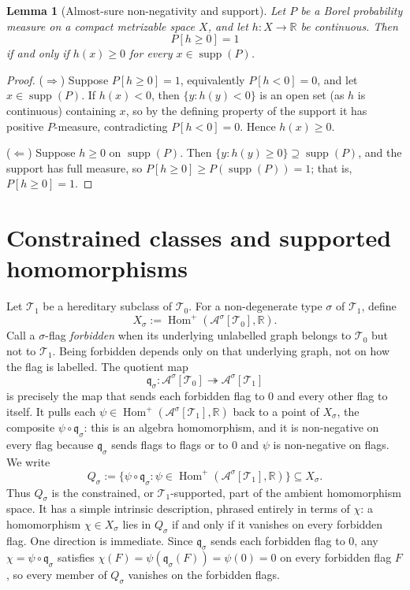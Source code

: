 \documentclass[11pt]{article}
\newtheorem{lemma}[theorem]{Lemma}
\theoremstyle{definition}
\newcommand{\R}{\mathbb{R}}
\newcommand{\A}{\mathcal{A}}
\newcommand{\T}{\mathcal{T}}
\newcommand{\Homp}{\operatorname{Hom}^{+}}
\newcommand{\supp}{\operatorname{supp}}
\newcommand{\qmap}{\mathfrak q}
\begin{document}
\begin{lemma}[Almost-sure non-negativity and support]\label{lem:support-as}
Let $P$ be a Borel probability measure on a compact metrizable space $X$, and let
$h:X\to\R$ be continuous.  Then
\[
  P[h\ge0]=1
\]
if and only if $h(x)\ge0$ for every $x\in\supp(P)$.
\end{lemma}

\begin{proof}
($\Rightarrow$) Suppose $P[h\ge0]=1$, equivalently $P[h<0]=0$, and let
$x\in\supp(P)$.  If $h(x)<0$, then $\{y:h(y)<0\}$ is an open set (as $h$ is continuous)
containing $x$, so by the defining property of the support it has positive $P$-measure,
contradicting $P[h<0]=0$.  Hence $h(x)\ge0$.

($\Leftarrow$) Suppose $h\ge0$ on $\supp(P)$.  Then
$\{y:h(y)\ge0\}\supseteq\supp(P)$, and the support has full measure, so
$P[h\ge0]\ge P(\supp(P))=1$; that is, $P[h\ge0]=1$.
\end{proof}

\section{Constrained classes and supported homomorphisms}

Let $\T_1$ be a hereditary subclass of $\T_0$.  For a non-degenerate type $\sigma$ of
$\T_1$, define
\[
  X_\sigma:=\Homp(\A^\sigma[\T_0],\R).
\]
Call a $\sigma$-flag \emph{forbidden} when its underlying unlabelled graph belongs to
$\T_0$ but not to $\T_1$.  Being forbidden depends only on
that underlying graph, not on how the flag is labelled.  The quotient map
\[
  \qmap_\sigma:\A^\sigma[\T_0]\twoheadrightarrow\A^\sigma[\T_1]
\]
is precisely the map that sends each forbidden flag to $0$ and every other flag to itself.
It pulls each $\psi\in\Homp(\A^\sigma[\T_1],\R)$ back to a point of $X_\sigma$, the composite
${\psi} \circ {\qmap_\sigma}$: this is an algebra homomorphism, and it is non-negative on every
flag because $\qmap_\sigma$ sends flags to flags or to $0$ and $\psi$ is non-negative on
flags.  We write
\[
  Q_\sigma
  :=
  \{\psi\circ\qmap_\sigma:
      \psi\in\Homp(\A^\sigma[\T_1],\R)\}
  \subseteq X_\sigma.
\]
Thus $Q_\sigma$ is the constrained, or $\T_1$-supported, part of the ambient homomorphism
space.  It has a simple intrinsic description, phrased entirely in terms of $\chi$: a
homomorphism $\chi\in X_\sigma$ lies in $Q_\sigma$ if and only if it vanishes on every
forbidden flag.  One direction is immediate.  Since $\qmap_\sigma$ sends each forbidden
flag to $0$, any $\chi=\psi\circ\qmap_\sigma$ satisfies
$\chi(F)=\psi(\qmap_\sigma(F))=\psi(0)=0$ on every forbidden flag $F$, so every member of
$Q_\sigma$ vanishes on the forbidden flags.
\end{document}
